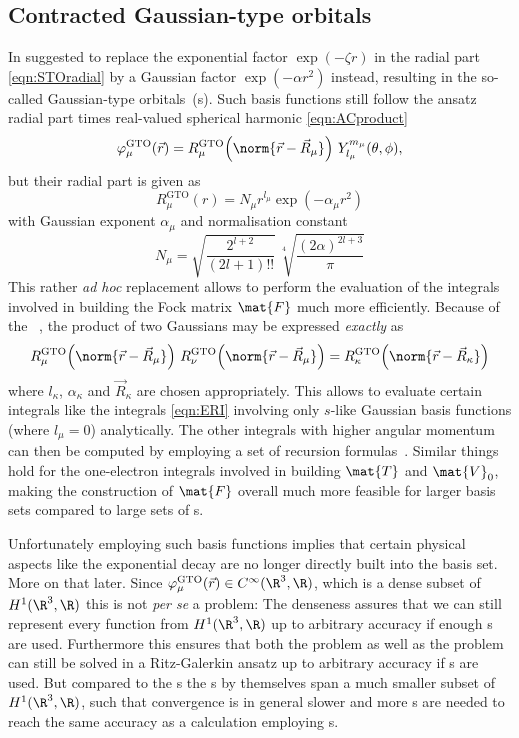 \subsection{Contracted Gaussian-type orbitals}
\label{sec:cGTO}

In \citeyear{Boys1950} \citeauthor{Boys1950} suggested to replace
the exponential factor $\exp(- \zeta r)$ in the radial part \eqref{eqn:STOradial}
by a Gaussian factor $\exp(-\alpha r^2)$ instead,
resulting in the so-called Gaussian-type orbitals~({\GTO}s).
Such \GTO basis functions still follow the ansatz radial part times real-valued spherical harmonic
\eqref{eqn:ACproduct}
\begin{equation}
	\varphi^\text{GTO}_\mu(\vec{r}) = R^\text{GTO}_\mu\!\left(\norm{\vec{r} - \vec{R}_\mu}\right)
	\, Y_{l_\mu}^{m_\mu}(\theta, \phi),
	\label{eqn:ACproduct}
\end{equation}
but their radial part is given as
\begin{equation}
	R^\text{GTO}_\mu(r) = N_\mu r^{l_\mu} \exp(-\alpha_\mu r^2)
	\label{eqn:GTOradial}
\end{equation}
with Gaussian exponent $\alpha_\mu$ and normalisation constant
\[
	N_\mu =  \sqrt{\frac{2^{l+2}}{(2l+1)!!}} \, \sqrt[4]{\frac{(2\alpha)^{2l+3}}{\pi}}
\]
This rather \textit{ad hoc} replacement allows to perform the
evaluation of the integrals involved in building the Fock matrix $\mat{F}$
much more efficiently.
Because of the %
~\cite{Boys1950,Szabo1996,Besalu2011},
the product of two Gaussians may be expressed \emph{exactly} as
\[
	R^\text{GTO}_\mu\!\left( \norm{\vec{r} - \vec{R}_\mu}\right)
	\,
	R^\text{GTO}_\nu\!\left( \norm{\vec{r} - \vec{R}_\mu}\right)
	= R^\text{GTO}_\kappa\!\left( \norm{\vec{r} - \vec{R}_\kappa}\right)
\]
where $l_\kappa$, $\alpha_\kappa$ and $\vec{R}_\kappa$ are chosen appropriately.
This allows to evaluate certain integrals
like the \ERI integrals \eqref{eqn:ERI} involving only
$s$-like Gaussian basis functions (where $l_\mu=0$) analytically.
The other  \ERI integrals with higher angular momentum can then be computed by
employing a set of recursion formulas~\cite{Gill1994}.
Similar things hold for the one-electron integrals involved in building
$\mat{T}$ and $\mat{V}_0$,
making the construction of $\mat{F}$ overall much more
feasible for larger basis sets compared to large sets of {\STO}s.

Unfortunately employing such \GTO basis functions implies
that certain physical aspects like the exponential decay
are no longer directly built into the basis set.
More on that later.
Since $\varphi^\text{GTO}_\mu(\vec{r}) \in C^\infty(\R^3, \R)$,
which is a dense subset of $H^1(\R^3, \R)$
this is not \textit{per se} a problem:
The denseness assures that we can still represent every function
from $H^1(\R^3, \R)$ up to arbitrary accuracy
if enough {\GTO}s are used.
Furthermore this ensures that both the \HF problem as well as
the \FCI problem can still be solved
in a Ritz-Galerkin ansatz up to arbitrary accuracy if {\GTO}s are used.
But compared to the {\STO}s the {\GTO}s by themselves span a much smaller subset
of $H^1(\R^3, \R)$,
such that convergence is in general slower and more {\GTO}s are needed
to reach the same accuracy as a calculation employing {\STO}s.

